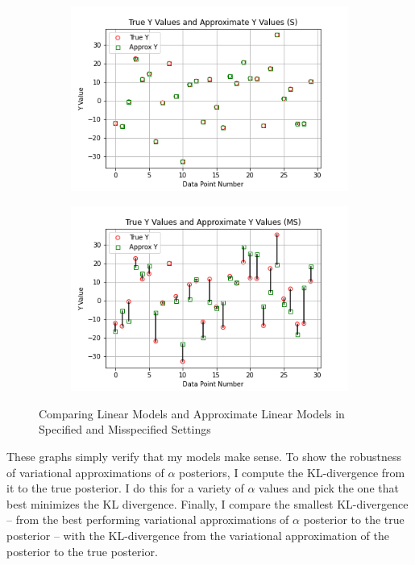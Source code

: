 \documentclass[letterpaper,12pt]{article}
\begin{document}
\begin{figure}[h]
\centering
    \begin{subfigure}{0.49\textwidth}
        \includegraphics[width=\linewidth]{plots/True_Y_Values_and_Approximate_Y_Values_(S).png}
    \end{subfigure}
    \begin{subfigure}{0.49\textwidth}
        \includegraphics[width=\linewidth]{plots/True_Y_Values_and_Approximate_Y_Values_(MS).png}
    \end{subfigure}
    \caption{Comparing Linear Models and Approximate Linear Models in Specified and Misspecified Settings}
\end{figure}

These graphs simply verify that my models make sense. To show the robustness of variational approximations of $\alpha$ posteriors, I compute the KL-divergence from it to the true posterior. I do this for a variety of $\alpha$ values and pick the one that best minimizes the KL divergence. Finally, I compare the smallest KL-divergence -- from the best performing variational approximations of $\alpha$ posterior to the true posterior -- with the KL-divergence from the variational approximation of the posterior to the true posterior.
\end{document}
